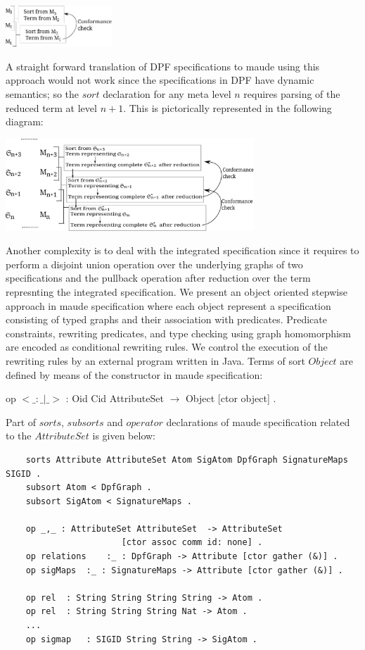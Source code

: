 \documentclass{eceasst}
\begin{document}
\begin{center}
\includegraphics[width=0.3\textwidth]{mof.pdf}
\end{center}

A straight forward translation of DPF specifications to maude using this approach would not work since the specifications in DPF have dynamic semantics; 
so the $sort$ declaration for any meta level $n$ requires parsing of the reduced term at level $n+1$.    
This is pictorically represented in the following diagram:

\begin{center}
\includegraphics[width=0.7\textwidth]{mof-dpf.pdf}
\end{center}

Another complexity is to deal with the integrated specification since it requires to perform a disjoint union operation over the underlying graphs of two specifications and the pullback operation 
after reduction over the term represnting the integrated specification. 
We present an object oriented stepwise approach in maude specification where each object represent a specification consisting of typed graphs and their association with predicates. 
Predicate constraints, rewriting predicates, and type checking using graph homomorphism are encoded as conditional rewriting rules. 
We control the execution of the rewriting rules by an external program written in Java. Terms of sort $Object$ are defined by means of the constructor in maude specification:

\begin{center}
 op $<\_:\_|\_>$ : Oid Cid AttributeSet	$\rightarrow$ Object 	[ctor object] .
\end{center}

Part of $sorts$, $subsorts$ and $operator$ declarations of maude specification related to the $AttributeSet$ is given below:

\tiny
\begin{verbatim}
	sorts Attribute AttributeSet Atom SigAtom DpfGraph SignatureMaps SIGID .	
	subsort Atom < DpfGraph .
	subsort SigAtom < SignatureMaps .

	op _,_ : AttributeSet AttributeSet 	-> AttributeSet 
				       [ctor assoc comm id: none] .	
	op relations 	:_ : DpfGraph -> Attribute [ctor gather (&)] .
	op sigMaps 	:_ : SignatureMaps -> Attribute [ctor gather (&)] .
	
	op rel 	: String String String String -> Atom .
	op rel 	: String String String Nat -> Atom .
	...
	op sigmap 	: SIGID String String -> SigAtom .
\end{verbatim}
\normalsize
\end{document}
